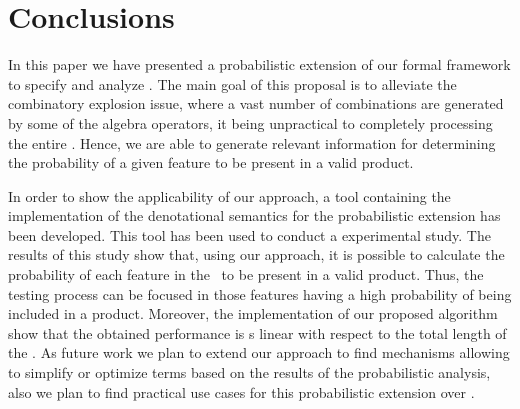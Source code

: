 \section{Conclusions}
\label{section:jstat:concs}

In this paper we have presented a probabilistic extension of our 
formal framework to specify and analyze \SPLs. The main goal of this 
proposal is to alleviate the combinatory explosion issue, where a vast
number of combinations are generated by some of the algebra operators,
it being unpractical to completely processing the entire \SPL. Hence, we
are able to generate relevant information for determining the probability 
of a given feature to be present in a valid product.

In order to show the applicability of our approach, a tool containing the 
implementation of the denotational semantics for the probabilistic extension
has been developed. This tool has been used to conduct a experimental study.
%
The results of this study show that, using our approach, it is possible to calculate 
the probability of each feature in the \SPL\ to be present in a valid product. 
Thus, the testing process can be focused in those features having a high probability 
of being included in a product. Moreover, the implementation of our proposed algorithm
show that the obtained performance is s linear with respect to the total length of the \SPL.
%
%
%
%
As future work we plan to extend our approach%
to find mechanisms allowing to simplify or optimize terms
based on the results of the probabilistic analysis, also
we plan to find practical use cases for this probabilistic
extension over \SPLs.



